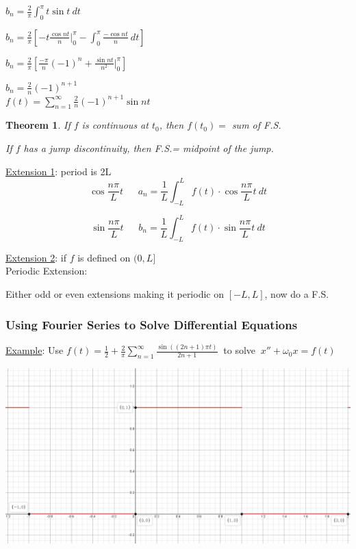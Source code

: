 \documentclass[12pt]{article}
\numberwithin{equation}{subsection}
\newtheorem{theorem}{Theorem}[section]
\newcommand{\sinp}[1]{\sin\left( #1 \right)}
\newcommand{\indb}{\hspace{1cm}}
\newcommand{\indc}{\hspace{1.5cm}}
\newcommand{\indd}{\hspace{2cm}}
\newcommand{\indh}{\hspace{4cm}}
\newcommand{\exa}{\noindent \underline{Example}: \hspace{1cm}}
\begin{document}
\indh $b_n = \frac{2}{\pi} \int_0^\pi t \sin t \ dt$

\indh $b_n = \frac{2}{\pi} \left[ -t\frac{\cos nt}{n} \vert^\pi_0 - \int_0^\pi \frac{-\cos nt}{n} \ dt \right]$

\indh $b_n = \frac{2}{\pi} \left[ \frac{-\pi}{n}(-1)^n  + \frac{\sin nt}{n^2} \vert^\pi_0 \right]$

\indh $b_n = \frac{2}{n} (-1)^{n+1}$\\

\indd $\displaystyle f(t) = \sum_{n=1}^{\infty}\frac{2}{n}(-1)^{n+1}\sin nt$

\begin{theorem}
If $f$ is continuous at $t_0$, then $f(t_0) =$ sum of F.S.

If $f$ has a jump discontinuity, then F.S.= midpoint of the jump.
\end{theorem}
\newpage

\underline{Extension 1}: period is 2L
\begin{equation}
\cos \frac{n\pi}{L}t \ \ \ \ \ \ \ a_n=\frac{1}{L} \int_{-L}^{L} f(t) \cdot \cos \frac{n \pi}{L}t\ dt
\end{equation}

\begin{equation}
\sin \frac{n\pi}{L}t \ \ \ \ \ \ \ b_n=\frac{1}{L} \int_{-L}^{L} f(t) \cdot \sin \frac{n \pi}{L}t\ dt
\end{equation}

\underline{Extension 2}: if $f$ is defined on $(0,L]$\\

\indb Periodic Extension:

\indc Either odd or even extensions making it periodic on $[-L,L]$, now do a F.S.

\subsubsection{Using Fourier Series to Solve Differential Equations}

\exa Use $\displaystyle f(t)= \frac{1}{2}+\frac{2}{\pi}\sum_{n=1}^{\infty}\frac{\sinp{(2n+1)\pi t}}{2n+1}\ $ to solve $\ x''+\omega_0x=f(t)$

\includegraphics[scale=.25]{ExampleF2} 
\end{document}
